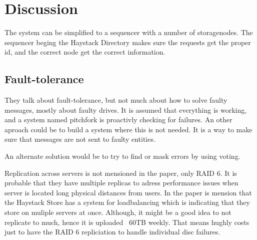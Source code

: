 \section{Discussion}
The system can be simplified to a sequencer with a number of storagenodes.
The sequencer beging the Haystack Directory makes sure the requests get the 
proper id, and the correct node get the correct information. 
\subsection{Fault-tolerance}
They talk about fault-tolerance, but not much about how to solve faulty messages, mostly
about faulty drives. It is assumed that everything is working, and a system named pitchfork
is proactivly checking for failures. An other aproach could be to build a system where this
is not needed. It is a way to make sure that messages are not sent to faulty entities. 

An alternate solution would be to try to find or mask errors by using voting. 

Replication across servers is not mensioned in the paper, only RAID 6. It is probable that
they have multiple replicas to adress performance issues when server is located
long physical distances from users. In the paper is mension that the Haystack Store 
has a system for loadbalancing which is indicating that they store on muliple servers
at once. Although, it might be a good idea to not replicate to much, hence it is uploaded
~60TB weekly. That means hughly costs just to have the RAID 6 repliciation to handle
individual disc failures. 


